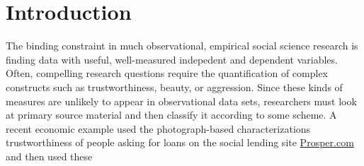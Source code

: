 \documentclass{chi2009}
\begin{document}


\section{Introduction}
The binding constraint in much observational, empirical social
science research is finding data with useful, well-measured indepedent
and dependent variables. Often, compelling research questions require the quantification of complex constructs such as trustworthiness, beauty, or aggression. Since these kinds of measures are unlikely to appear in observational data sets, researchers must look at primary source material and then classify it according to some scheme. A recent economic
  example used the photograph-based characterizations trustworthiness
  of people asking for loans on the social lending site
  \href{http://www.prosper.com}{Prosper.com} and then used these
\end{document}
